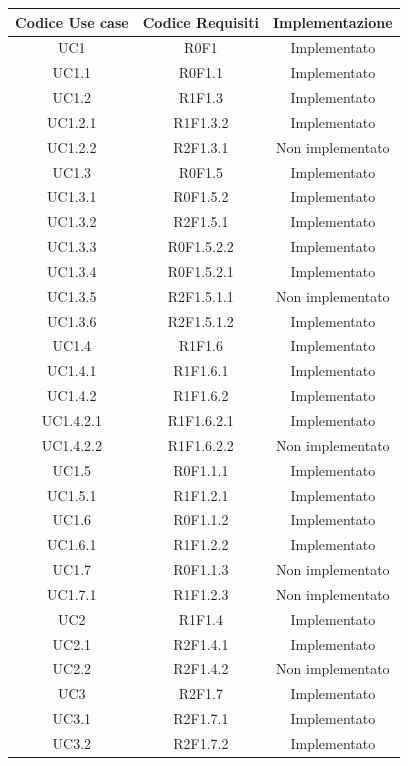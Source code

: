 \begin{longtable}{|c|c|c|}
	\hline
	\textbf{Codice Use case} & \textbf{Codice Requisiti} & \textbf{Implementazione} \\
	\hline
	\endhead
	UC1 & R0F1 & Implementato\\
	\hline
	UC1.1 & R0F1.1 & Implementato\\
	\hline
	UC1.2 & R1F1.3 & Implementato\\
	\hline
	UC1.2.1 & R1F1.3.2 & Implementato\\
	\hline
	UC1.2.2 & R2F1.3.1 & Non implementato\\
	\hline
	UC1.3 & R0F1.5 & Implementato\\
	\hline
	UC1.3.1 & R0F1.5.2 & Implementato\\
	\hline
	UC1.3.2 & R2F1.5.1 & Implementato\\
	\hline
	UC1.3.3 & R0F1.5.2.2 & Implementato\\
	\hline
	UC1.3.4 & R0F1.5.2.1 & Implementato\\
	\hline
	UC1.3.5 & R2F1.5.1.1 & Non implementato\\
	\hline
	UC1.3.6 & R2F1.5.1.2 & Implementato\\
	\hline
	UC1.4 & R1F1.6 & Implementato\\
	\hline
	UC1.4.1 & R1F1.6.1 & Implementato\\
	\hline
	UC1.4.2 & R1F1.6.2 & Implementato\\
	\hline
	UC1.4.2.1 & R1F1.6.2.1 & Implementato\\
	\hline
	UC1.4.2.2 & R1F1.6.2.2 & Non implementato\\
	\hline
	UC1.5 & R0F1.1.1 & Implementato\\
	\hline
	UC1.5.1 & R1F1.2.1 & Implementato\\
	\hline
	UC1.6 & R0F1.1.2 & Implementato\\
	\hline
	UC1.6.1 & R1F1.2.2 & Implementato\\
	\hline
	UC1.7 & R0F1.1.3 & Non implementato\\
	\hline
	UC1.7.1 & R1F1.2.3 & Non implementato\\
	\hline
	UC2 & R1F1.4 & Implementato\\
	\hline
	UC2.1 & R2F1.4.1 & Implementato\\
	\hline
	UC2.2 & R2F1.4.2 & Non implementato\\
	\hline
	UC3 & R2F1.7 & Implementato\\
	\hline
	UC3.1 & R2F1.7.1 & Implementato\\
	\hline
	UC3.2 & R2F1.7.2 & Implementato\\

\end{longtable}
